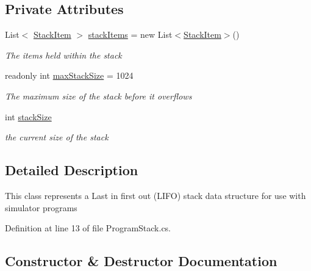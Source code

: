 \subsection*{Private Attributes}
\begin{DoxyCompactItemize}
\item 
List$<$ \hyperlink{class_c_p_u___o_s___simulator_1_1_c_p_u_1_1_stack_item}{Stack\+Item} $>$ \hyperlink{class_c_p_u___o_s___simulator_1_1_c_p_u_1_1_program_stack_ada087487ee69e4e38e2f2591bdc28f37}{stack\+Items} = new List$<$\hyperlink{class_c_p_u___o_s___simulator_1_1_c_p_u_1_1_stack_item}{Stack\+Item}$>$()
\begin{DoxyCompactList}\small\item\em The items held within the stack \end{DoxyCompactList}\item 
readonly int \hyperlink{class_c_p_u___o_s___simulator_1_1_c_p_u_1_1_program_stack_a2e475bb3c8ce48b8b0a86e31b2cb972e}{max\+Stack\+Size} = 1024
\begin{DoxyCompactList}\small\item\em The maximum size of the stack before it overflows \end{DoxyCompactList}\item 
int \hyperlink{class_c_p_u___o_s___simulator_1_1_c_p_u_1_1_program_stack_ab0667a30e4d6e10c3ffddfdfbc084102}{stack\+Size}
\begin{DoxyCompactList}\small\item\em the current size of the stack \end{DoxyCompactList}\end{DoxyCompactItemize}


\subsection{Detailed Description}
This class represents a Last in first out (L\+I\+F\+O) stack data structure for use with simulator programs 



Definition at line 13 of file Program\+Stack.\+cs.



\subsection{Constructor \& Destructor Documentation}
\hypertarget{class_c_p_u___o_s___simulator_1_1_c_p_u_1_1_program_stack_a2a30dfbb7df3408de94c883c44aff090}{}
